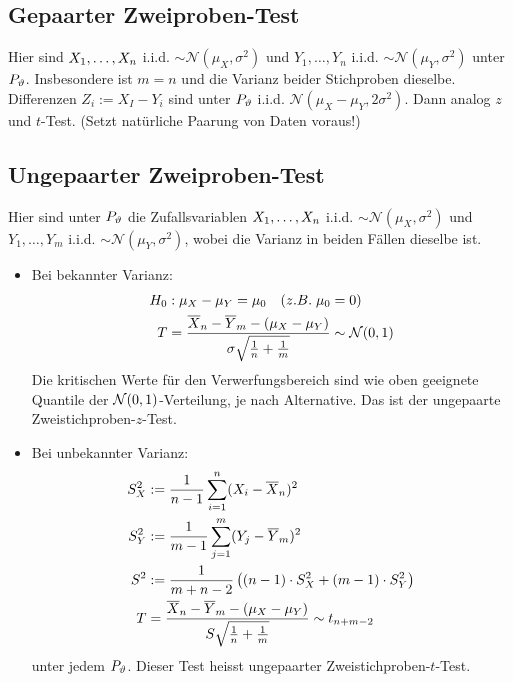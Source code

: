 \subsection{Gepaarter Zweiproben-Test}
Hier sind $X_1, \dots, X_n$ i.i.d. $\sim \mathcal{N} (\mu_X, \sigma^2)$ und
$Y_1, \dots, Y_n$ i.i.d. $\sim \mathcal{N} (\mu_Y, \sigma^2)$ unter $P_\vartheta$.
Insbesondere ist $m = n$ und die Varianz beider Stichproben dieselbe.
Differenzen $Z_i := X_I - Y_i$ sind unter $P_\vartheta$ i.i.d. $\mathcal{N} (\mu_X -
  \mu_Y, 2 \sigma^2)$. Dann analog $z$ und $t$-Test. (Setzt natürliche Paarung
von Daten voraus!)
\subsection{Ungepaarter Zweiproben-Test}
Hier sind unter $P_\vartheta$ die Zufallsvariablen $X_1, \dots, X_n$ i.i.d. $\sim
  \mathcal{N} (\mu_X, \sigma^2)$ und $Y_1, \dots, Y_m$ i.i.d. $\sim \mathcal{N}
  (\mu_Y, \sigma^2)$, wobei die Varianz in beiden Fällen dieselbe ist.
\begin{itemize}
  \item Bei bekannter Varianz:
        \begin{align*}
          H_0 & : \mu_X - \mu_Y = \mu_0 \quad  (z.B. \; \mu_0 = 0)                                                                                \\
          T   & = \frac{\overline{X}_n - \overline{Y}_m -  (\mu_X - \mu_Y)}{\sigma \sqrt{\frac{1}{n} + \frac{1}{m}}} \sim \mathcal{N} (0, 1)
        \end{align*}
        Die kritischen Werte für den Verwerfungsbereich sind wie oben
        geeignete Quantile der $\mathcal{N} (0, 1)$-Verteilung, je nach
        Alternative. Das ist der ungepaarte Zweistichproben-$z$-Test.

  \item Bei unbekannter Varianz:
        \begin{align*}
          S_X^2 & := \frac{1}{n-1} \sum_{i = 1}^n  (X_i - \overline{X}_n)^2                                                                 \\
          S_Y^2 & := \frac{1}{m-1} \sum_{j = 1}^m  (Y_j - \overline{Y}_m)^2                                                      \\
          S^2   & := \frac{1}{m+n-2} \left(  (n-1) \cdot S_X^2 +  (m-1) \cdot S_Y^2 \right)                                      \\
          T     & = \frac{\overline{X}_n - \overline{Y}_m -  (\mu_X - \mu_Y)}{S \sqrt{\frac{1}{n} + \frac{1}{m}}} \sim t_{n+m-2}
        \end{align*}
        unter jedem $P_\vartheta$. Dieser Test heisst ungepaarter Zweistichproben-$t$-Test.
\end{itemize}
